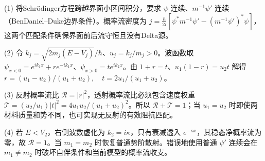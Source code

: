 (1) 将Schrödinger方程跨越界面小区间积分，要求 \(\psi\) 连续、\(m^{-1}\psi'\) 连续（BenDaniel–Duke边界条件）。概率流密度为 \(j=\frac\hbar{2i}[\psi^*m^{-1}\psi'-(m^{-1}\psi')^*\psi]\)，这两个匹配条件确保界面前后流守恒且没有Delta源。

(2) 令 \(k_j=\sqrt{2m_j(E-V_j)}/\hbar\)、\(u_j=k_j/m_j>0\)。波函数取 \(\psi_{x<0}=e^{ik_1x}+r e^{-ik_1x}\)、\(\psi_{x>0}=t e^{ik_2x}\)。由 \(1+r=t\)、\(u_1(1-r)=u_2t\) 解得 \(\boxed{r=(u_1-u_2)/(u_1+u_2),\quad t=2u_1/(u_1+u_2)}\)。

(3) 反射概率流比 \(\mathcal R=|r|^2\)，透射概率流比必须包含速度权重 \(\mathcal T=(u_2/u_1)|t|^2=4u_1u_2/(u_1+u_2)^2\)。所以 \(\mathcal R+\mathcal T=1\)；当 \(u_1=u_2\) 时即使两材料质量和势不同，也可实现无反射的有效阻抗匹配。

(4) 若 \(E<V_2\)，右侧波数虚化为 \(k_2=i\kappa\)，只有衰减透入 \(e^{-\kappa x}\)，其稳态净概率流为零，故 \(\mathcal R=1\)。当 \(m_1=m_2\) 时恢复普通势阶散射。错误地使用普通 \(\psi'\) 连续会在 \(m_1\ne m_2\) 时破坏自伴条件和当前模型的概率流收支。

